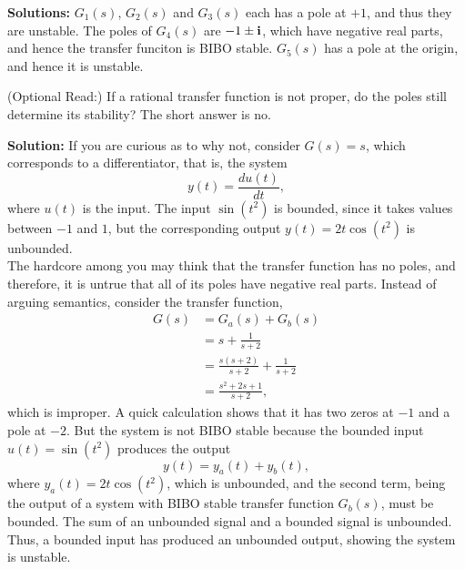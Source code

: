 \textbf{Solutions:} $G_1(s)$, $G_2(s)$ and $G_3(s)$ each has a pole at $+1$, and thus they are unstable. The  poles of $G_4(s)$ are $-1\pm \mathop{\bm{\mathrm i}}$, which have negative real parts, and hence the transfer funciton is BIBO stable. $G_5(s)$ has a pole at the origin, and hence it is unstable. 
\Qed

\vspace*{.2cm}
\begin{center}
\setlength{\fboxrule}{2pt}  %
\end{center}
\vspace*{.2cm}


\begin{example}(Optional Read:) If a rational transfer function is not proper, do the poles still determine its stability? The short answer is no.
    
\end{example}
\textbf{Solution:}
 If you are curious as to why not, consider $G(s) = s$, which corresponds to a differentiator, that is, the system
$$y(t) = \frac{d u(t)}{dt},$$
where $u(t)$ is the input. The input $\sin(t^2)$ is bounded, since it takes values between $-1$ and $1$, but the corresponding output $y(t) = 2 t \cos(t^2)$ is unbounded. \\

The hardcore among you may think that the transfer function has no poles, and therefore, it is untrue that all of its poles have negative real parts. Instead of arguing semantics, consider the transfer function,
\begin{align*}
G(s) &= G_a(s) + G_b(s) \\
& = s + \frac{1}{s+2} \\
& = \frac{s(s+2)}{s+2} + \frac{1}{s+2} \\
& = \frac{s^2+2s+1}{s+2},
\end{align*}
which is improper. A quick calculation shows that it has two zeros at $-1$ and a pole at $-2$. But the system is not BIBO stable because the bounded input $u(t) = \sin(t^2)$ produces the output
$$ y(t) = y_a(t) + y_b(t),$$
where $y_a(t) = 2 t \cos(t^2)$, which is unbounded, and the second term, being the output of a system with BIBO stable transfer function $G_b(s)$, must be bounded. The sum of an unbounded signal and a bounded signal is unbounded. Thus, a bounded input has produced an unbounded output, showing the system is unstable.
\Qed

